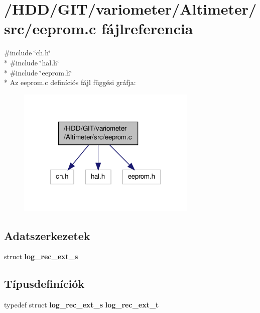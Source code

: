 \section{/\-H\-D\-D/\-G\-I\-T/variometer/\-Altimeter/src/eeprom.c fájlreferencia}
\label{eeprom_8c}
{\ttfamily \#include \char`\"{}ch.\-h\char`\"{}}\\*
{\ttfamily \#include \char`\"{}hal.\-h\char`\"{}}\\*
{\ttfamily \#include \char`\"{}eeprom.\-h\char`\"{}}\\*
Az eeprom.\-c definíciós fájl függési gráfja\-:
\nopagebreak
\begin{figure}[H]
\begin{center}
\leavevmode
\includegraphics[width=244pt]{eeprom_8c__incl}
\end{center}
\end{figure}
\subsection*{Adatszerkezetek}
\begin{DoxyCompactItemize}
\item 
struct {\bf log\-\_\-rec\-\_\-ext\-\_\-s}
\end{DoxyCompactItemize}
\subsection*{Típusdefiníciók}
\begin{DoxyCompactItemize}
\item 
typedef struct {\bf log\-\_\-rec\-\_\-ext\-\_\-s} {\bf log\-\_\-rec\-\_\-ext\-\_\-t}
\end{DoxyCompactItemize}
